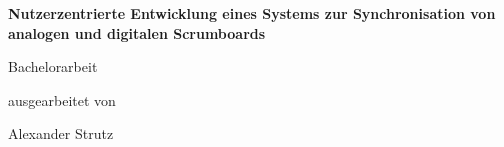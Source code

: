 \begin{titlepage}

\begin{center}

\begin{figure}[!ht]
\end{figure}

\vspace{0.4cm}

\begin{rmfamily}
\begin{huge}
\textbf{Nutzerzentrierte Entwicklung eines Systems zur Synchronisation von analogen und digitalen Scrumboards}\\	
\end{huge}
\vspace{0.5cm}
\end{rmfamily}

\vspace{0.8cm}



\begin{LARGE}
\begin{scshape}
Bachelorarbeit\\[0.8em]
\end{scshape}
\end{LARGE}

\begin{large}
ausgearbeitet von\\ 
\vspace{0.3cm}
\begin{LARGE}
Alexander Strutz\\
\end{LARGE}
\end{large}


\end{center}
\end{titlepage}
